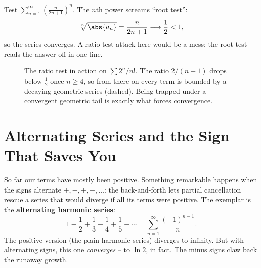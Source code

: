 \begin{example}
Test $\displaystyle\sum_{n=1}^\infty \left(\frac{n}{2n+1}\right)^n$. The $n$th power screams ``root test'':
\[
\sqrt[n]{\abs{a_n}} = \frac{n}{2n+1} \longrightarrow \frac12 < 1,
\]
so the series converges. A ratio-test attack here would be a mess; the root test reads the answer off in one line.
\end{example}

\begin{figure}[H]
\centering
{}
\caption{The ratio test in action on $\sum 2^n/n!$. The ratio $2/(n+1)$ drops below $\tfrac12$ once $n\ge 4$, so from there on every term is bounded by a decaying geometric series (dashed). Being trapped under a convergent geometric tail is exactly what forces convergence.}
\label{ch29:fig-ratio}
\end{figure}

\section{Alternating Series and the Sign That Saves You}
\label{ch29:alternating}

So far our terms have mostly been positive. Something remarkable happens when the signs alternate $+,-,+,-,\dots$: the back-and-forth lets partial cancellation rescue a series that would diverge if all its terms were positive. The exemplar is the \textbf{alternating harmonic series}:
\[
1 - \frac{1}{2} + \frac{1}{3} - \frac{1}{4} + \frac{1}{5} - \cdots = \sum_{n=1}^\infty \frac{(-1)^{n-1}}{n}.
\]
The positive version (the plain harmonic series) diverges to infinity. But with alternating signs, this one \emph{converges} -- to $\ln 2$, in fact. The minus signs claw back the runaway growth.

